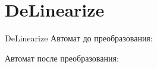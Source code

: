 \section{DeLinearize}
\begin{frame}{DeLinearize}
	Автомат до преобразования:


	Автомат после преобразования:


\end{frame}
